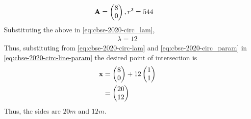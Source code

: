 \documentclass[journal,12pt,twocolumn]{IEEEtran}
\begin{document}
\begin{enumerate}[label=4.\arabic*]
\begin{enumerate}
\begin{align}
			    \\
			     \mathbf{A} &= \begin{pmatrix}8 \\ 0\end{pmatrix},  r^2 = 544
		    \end{align}
		    Substituting the above in 
			    \eqref{eq:cbse-2020-circ_lam}, 
		    \begin{align}
			    \lambda = 12
			    \label{eq:cbse-2020-circ-lam}
		    \end{align}
		    Thus, substituting from 
			    \eqref{eq:cbse-2020-circ-lam}
			    and 
			    \eqref{eq:cbse-2020-circ_param}
			    in 
			    \eqref{eq:cbse-2020-circ-line-param}
			    the desired point of intersection is 
		    \begin{align}
			    \mathbf{x} &= \begin{pmatrix}8 \\ 0\end{pmatrix} +  12 \begin{pmatrix}1 \\ 1\end{pmatrix}
			    \\
			    &= \begin{pmatrix}20 \\ 12\end{pmatrix}
		    \end{align}
		    Thus, the sides are $20m$ and $12m$.
			    

\end{enumerate}
\end{enumerate}
\end{document}
